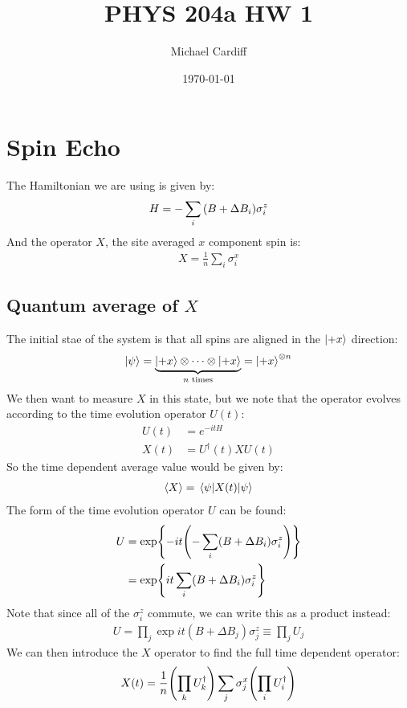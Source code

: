 \documentclass[12pt]{article}
\title{\vspace{-3em}PHYS 204a HW 1}
\author{Michael Cardiff}
\date{\today}
\begin{document}
\maketitle

\section{Spin Echo}
The Hamiltonian we are using is given by:
\begin{align*}
  H=-\sum_i\qty(B+\Delta B_i)\sigma_i^z
\end{align*}
And the operator $X$, the site averaged $x$ component spin is:
\begin{align*}
  X=\frac1n\sum_i\sigma_i^x
\end{align*}
\subsection{Quantum average of $X$}
The initial stae of the system is that all spins are aligned in the $\ket{+x}$ direction:
\begin{align*}
  \ket{\psi}=\underbrace{\ket{+x}\otimes\cdots\otimes\ket{+x}}_{n\text{ times}}
  =\ket{+x}^{\otimes n}
\end{align*}
We then want to measure $X$ in this state, but we note that the operator evolves according to the time evolution operator $U(t)$:
\begin{align*}
  U(t)&=e^{-itH}\\
  X(t)&=U^\dag(t)XU(t)
\end{align*}
So the time dependent average value would be given by:
\begin{align*}
  \ev{X}=\mel{\psi}{X(t)}{\psi}
\end{align*}
The form of the time evolution operator $U$ can be found:
\begin{align*}
  U&=\exp{-it\qty(-\sum_i(B+\Delta B_i)\sigma_i^z)}\\
  &=\exp{it\sum_i(B+\Delta B_i)\sigma_i^z}
\end{align*}
Note that since all of the $\sigma_i^z$ commute, we can write this as a product instead:
\begin{align*}
  U=\prod_j\exp{it(B+\Delta B_j)\sigma_j^z}\equiv \prod_jU_j
\end{align*}
We can then introduce the $X$ operator to find the full time dependent operator:
\begin{align*}
  X(t)=\frac1n\qty(\prod_kU_k^\dag)\sum_j\sigma_j^x\qty(\prod_iU_i^\dag)
\end{align*}
\end{document}
